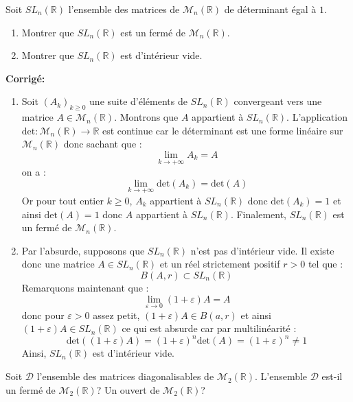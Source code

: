 \documentclass[a4paper,twoside,french,11pt]{VcCours}
\newcommand{\corr}{\textbf{Corrigé:}}
\begin{document}
\begin{Exercice}{} Soit $SL_n(\mathbb{R})$ l'ensemble des matrices de $\mathcal{M}_n(\mathbb{R})$ de déterminant égal à $1$.
\begin{enumerate}
\item Montrer que $SL_n(\mathbb{R})$ est un fermé de $\mathcal{M}_n(\mathbb{R})$.
\item Montrer que $SL_n(\mathbb{R})$ est d'intérieur vide.
\end{enumerate}
\end{Exercice}

\corr 

\begin{enumerate}
\item Soit $(A_k)_{k \geq 0}$ une suite d'éléments de $SL_n(\mathbb{R})$ convergeant vers une matrice $A \in \mathcal{M}_n(\mathbb{R})$. Montrons que $A$ appartient à $SL_n(\mathbb{R})$. L'application $\textrm{det} : \mathcal{M}_n(\mathbb{R}) \rightarrow \mathbb{R}$ est continue car le déterminant est une forme linéaire sur $\mathcal{M}_n(\mathbb{R})$ donc sachant que  :
$$ \lim_{k \rightarrow + \infty} A_k = A$$
on a :
$$ \lim_{k \rightarrow + \infty} \textrm{det}(A_k) = \textrm{det}(A)$$
Or pour tout entier $k \geq 0$, $A_k$ appartient à $SL_n(\mathbb{R})$ donc $\textrm{det}(A_k)=1$ et ainsi $\textrm{det}(A)=1$ donc $A$ appartient à $SL_n(\mathbb{R})$. Finalement, $SL_n(\mathbb{R})$ est un fermé de $\mathcal{M}_n(\mathbb{R})$.
\item Par l'absurde, supposons que $SL_n(\mathbb{R})$ n'est pas d'intérieur vide. Il existe donc une matrice $A \in SL_n(\mathbb{R})$ et un réel strictement positif $r>0$ tel que :
$$ B(A,r) \subset SL_n(\mathbb{R})$$
Remarquons maintenant que :
$$ \lim_{\varepsilon \rightarrow 0} (1+ \varepsilon) A= A$$
donc pour $\varepsilon>0$ assez petit, $(1+ \varepsilon) A \in B(a,r)$ et ainsi $(1+ \varepsilon) A \in SL_n(\mathbb{R})$ ce qui est absurde car par multilinéarité : 
$$ \textrm{det}((1+ \varepsilon)A)= (1+\varepsilon)^n \textrm{det}(A) = (1+\varepsilon)^n \neq 1$$
Ainsi, $SL_n(\mathbb{R})$ est d'intérieur vide.
\end{enumerate}

\begin{Exercice}{} Soit $\mathcal{D}$ l'ensemble des matrices diagonalisables de $\mathcal{M}_2(\mathbb{R})$. L'ensemble $\mathcal{D}$ est-il un fermé de $\mathcal{M}_2(\mathbb{R})$? Un ouvert de $\mathcal{M}_2(\mathbb{R})$?
\end{Exercice}
\end{document}
